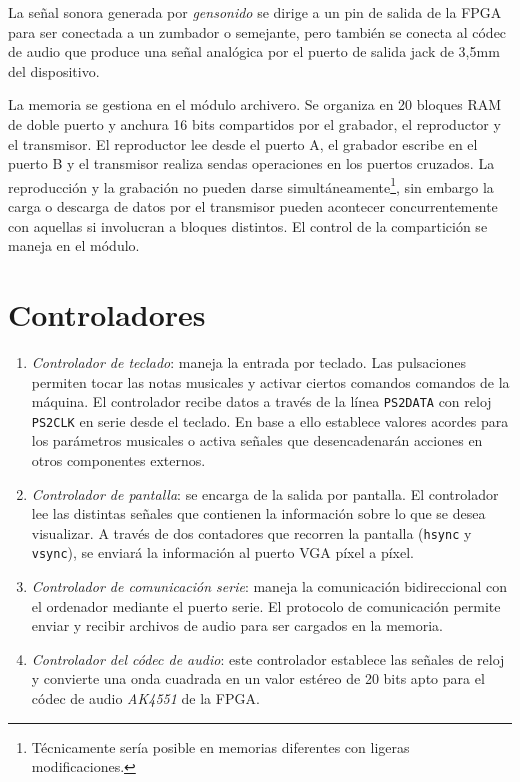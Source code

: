 \documentclass{article}
\begin{document}
	\medskip La señal sonora generada por {\itshape gensonido} se dirige a un pin de salida de la FPGA para ser conectada a un zumbador o semejante, pero también se conecta al códec de audio que produce una señal analógica por el puerto de salida jack de 3,5mm del dispositivo.

	\medskip La memoria se gestiona en el módulo archivero. Se organiza en 20 bloques RAM de doble puerto y anchura 16 bits compartidos por el grabador, el reproductor y el transmisor. El reproductor lee desde el puerto A, el grabador escribe en el puerto B y el transmisor realiza sendas operaciones en los puertos cruzados. La reproducción y la grabación no pueden darse simultáneamente\footnote{Técnicamente sería posible en memorias diferentes con ligeras modificaciones.}, sin embargo la carga o descarga de datos por el transmisor pueden acontecer concurrentemente con aquellas si involucran a bloques distintos. El control de la compartición se maneja en el módulo.

\section{Controladores}

\begin{enumerate}
	\item {\itshape Controlador de teclado}: maneja la entrada por teclado. Las pulsaciones permiten tocar las notas musicales y activar ciertos comandos comandos de la máquina. El controlador recibe datos a través de la línea \verb|PS2DATA| con reloj \verb|PS2CLK| en serie desde el teclado. En base a ello establece valores acordes para los parámetros musicales o activa señales que desencadenarán acciones en otros componentes externos.
	\item {\itshape Controlador de pantalla}: se encarga de la salida por pantalla. El controlador lee las distintas señales que contienen la información sobre lo que se desea visualizar. A través de dos contadores que recorren la pantalla (\verb|hsync| y \verb|vsync|), se enviará la información al puerto VGA píxel a píxel.
	\item {\itshape Controlador de comunicación serie}: maneja la comunicación bidireccional con el ordenador mediante el puerto serie. El protocolo de comunicación permite enviar y recibir archivos de audio para ser cargados en la memoria.
	\item {\itshape Controlador del códec de audio}: este controlador establece las señales de reloj y convierte una onda cuadrada en un valor estéreo de 20 bits apto para el códec de audio {\itshape AK4551} de la FPGA.
\end{enumerate}
\end{document}
